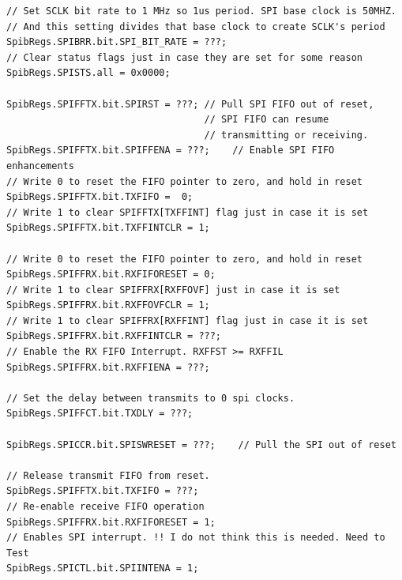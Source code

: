 \documentclass[11pt]{article}
\begin{document}
\begin{enumerate}
\begin{verbatim}
// Set SCLK bit rate to 1 MHz so 1us period. SPI base clock is 50MHZ.
// And this setting divides that base clock to create SCLK's period
SpibRegs.SPIBRR.bit.SPI_BIT_RATE = ???;
// Clear status flags just in case they are set for some reason
SpibRegs.SPISTS.all = 0x0000;

SpibRegs.SPIFFTX.bit.SPIRST = ???; // Pull SPI FIFO out of reset,
                                   // SPI FIFO can resume
                                   // transmitting or receiving.
SpibRegs.SPIFFTX.bit.SPIFFENA = ???;    // Enable SPI FIFO enhancements
// Write 0 to reset the FIFO pointer to zero, and hold in reset
SpibRegs.SPIFFTX.bit.TXFIFO =  0;
// Write 1 to clear SPIFFTX[TXFFINT] flag just in case it is set
SpibRegs.SPIFFTX.bit.TXFFINTCLR = 1;

// Write 0 to reset the FIFO pointer to zero, and hold in reset
SpibRegs.SPIFFRX.bit.RXFIFORESET = 0;
// Write 1 to clear SPIFFRX[RXFFOVF] just in case it is set
SpibRegs.SPIFFRX.bit.RXFFOVFCLR = 1;
// Write 1 to clear SPIFFRX[RXFFINT] flag just in case it is set
SpibRegs.SPIFFRX.bit.RXFFINTCLR = ???;
// Enable the RX FIFO Interrupt. RXFFST >= RXFFIL
SpibRegs.SPIFFRX.bit.RXFFIENA = ???;

// Set the delay between transmits to 0 spi clocks.
SpibRegs.SPIFFCT.bit.TXDLY = ???;

SpibRegs.SPICCR.bit.SPISWRESET = ???;    // Pull the SPI out of reset

// Release transmit FIFO from reset.
SpibRegs.SPIFFTX.bit.TXFIFO = ???;
// Re-enable receive FIFO operation
SpibRegs.SPIFFRX.bit.RXFIFORESET = 1;
// Enables SPI interrupt. !! I do not think this is needed. Need to Test
SpibRegs.SPICTL.bit.SPIINTENA = 1;


\end{verbatim}
\end{enumerate}
\end{document}
